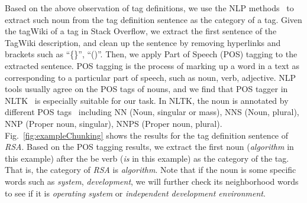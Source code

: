 Based on the above observation of tag definitions, we use the NLP methods~\cite{kazama2007exploiting, chen2016mining} to extract such noun from the tag definition sentence as the category of a tag.
Given the tagWiki of a tag in Stack Overflow, we extract the first sentence of the TagWiki description, and clean up the sentence by removing hyperlinks and brackets such as ``\{\}'', ``()''.
Then, we apply Part of Speech (POS) tagging to the extracted sentence.
POS tagging is the process of marking up a word in a text as corresponding to a particular part of speech, such as noun, verb, adjective.
NLP tools usually agree on the POS tags of nouns, and we find that POS tagger in NLTK~\cite{bird2004nltk} is especially suitable for our task.
In NLTK, the noun is annotated by different POS tags~\cite{web:nltktag} including NN (Noun, singular or mass), NNS (Noun, plural), NNP (Proper noun, singular), NNPS (Proper noun, plural).
Fig.~\ref{fig:exampleChunking} shows the results for the tag definition sentence of \textit{RSA}.
Based on the POS tagging results, we extract the first noun  (\textit{algorithm} in this example) after the be verb (\textit{is} in this example) as the category of the tag.
That is, the category of \textit{RSA} is \textit{algorithm}.
Note that if the noun is some specific words such as \textit{system}, \textit{development}, we will further check its neighborhood words to see if it is \textit{operating system} or \textit{independent development environment}.


